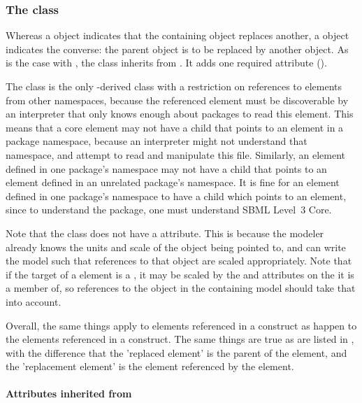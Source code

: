 \subsubsection{The  class}
\label{replacedby-class}

Whereas a \ReplacedElement object indicates that the containing object replaces another, a \ReplacedBy object indicates the converse: the parent object is to be replaced by another object.  As is the case with \ReplacedElement, the \ReplacedBy class inherits from \SBaseRef.  It adds one required attribute ().

The \ReplacedBy class is the only \SBaseRef-derived class with a restriction on references to elements from other namespaces, because the referenced element must be discoverable by an interpreter that only knows enough about packages to read this element.  This means that a core element may not have a \ReplacedBy child that points to an element in a package namespace, because an interpreter might not understand that namespace, and attempt to read and manipulate this file.  Similarly, an element defined in one package's namespace may not have a \ReplacedBy child that points to an element defined in an unrelated package's namespace.  It is fine for an element defined in one package's namespace to have a \ReplacedBy child which points to an \sbmlthreecore element, since to understand the package, one must understand SBML Level~3 Core.

Note that the \ReplacedBy class does not have a  attribute.  This is because the modeler already knows the units and scale of the object being pointed to, and can write the model such that  references to that object are scaled appropriately.  Note that if the target of a \ReplacedBy element is a \Reaction, it may be scaled by the  and  attributes on the \Submodel it is a member of, so references to the object in the containing model should take that into account.

Overall, the same things apply to elements referenced in a \ReplacedBy construct as happen to the elements referenced in a \ReplacedElement construct.  The same things are true as are listed in , with the difference that the 'replaced element' is the parent of the \ReplacedBy element, and the 'replacement element' is the element referenced by the \ReplacedBy element.


\paragraph{Attributes inherited from }

